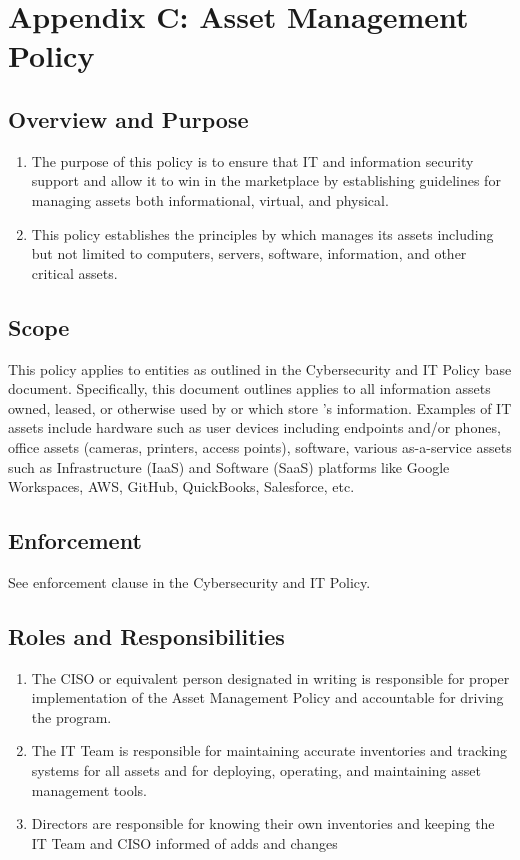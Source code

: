 \documentclass[../main.tex]{subfiles}
\begin{document}
\section{Appendix C: Asset Management Policy}
\subsection{Overview and Purpose}
\begin{enumerate}
    \item The purpose of this policy is to ensure that IT and information security support \CompanyName{} and allow it to win in the marketplace by establishing guidelines for managing assets both
    informational, virtual, and physical.
    \item This policy establishes the principles by which \CompanyName{} manages its assets including but not limited to computers, servers, software, information, and other critical assets.
\end{enumerate}
\subsection{Scope}
This policy applies to entities as outlined in the Cybersecurity and IT Policy base document. Specifically, this document outlines applies to all information assets owned, leased,
or otherwise used by \CompanyName{} or which store \CompanyName's information. Examples of IT assets include hardware such as user devices including endpoints and/or phones, office assets
(cameras, printers, access points), software, various as-a-service assets such as Infrastructure (IaaS) and Software (SaaS) platforms like Google Workspaces, AWS, GitHub, QuickBooks, Salesforce, etc.
\subsection{Enforcement}
See enforcement clause in the Cybersecurity and IT Policy.
\subsection{Roles and Responsibilities}
\begin{enumerate}
    \item The CISO or equivalent person designated in writing is responsible for proper implementation of the Asset Management Policy and accountable for driving the program.
    \item The IT Team is responsible for maintaining accurate inventories and tracking systems for all assets and for deploying, operating, and maintaining asset management tools.
    \item Directors are responsible for knowing their own inventories and keeping the IT Team and CISO informed of adds and changes
\end{enumerate}
\end{document}
